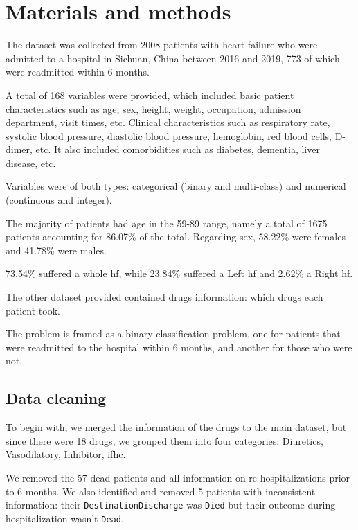 \section{Materials and methods}\label{sec:materials-methods}

The dataset was collected from 2008 patients with heart failure who were admitted to a hospital in Sichuan, China between 2016 and 2019, 773 of which were readmitted within 6 months.

A total of 168 variables were provided, which included basic patient characteristics such as age, sex, height, weight, occupation, admission department, visit times, etc. Clinical characteristics such as respiratory rate, systolic blood pressure, diastolic blood pressure, hemoglobin, red blood cells, D-dimer, etc. It also included comorbidities such as diabetes, dementia, liver disease, etc.

Variables were of both types: categorical (binary and multi-class) and numerical (continuous and integer).

The majority of patients had age in the 59-89 range, namely a total of 1675 patients accounting for 86.07\% of the total. Regarding sex, 58.22\% were females and 41.78\% were males.

73.54\% suffered a whole \gls{hf}, while 23.84\% suffered a Left \gls{hf} and 2.62\% a Right \gls{hf}.

The other dataset provided contained drugs information: which drugs each patient took.

The problem is framed as a binary classification problem, one for patients that were readmitted to the hospital within 6 months, and another for those who were not.

\subsection{Data cleaning}\label{sec:data-cleaning}

To begin with, we merged the information of the drugs to the main dataset, but since there were 18 drugs, we grouped them into four categories: Diuretics, Vasodilatory, Inhibitor, \gls{ifhc}.

We removed the 57 dead patients and all information on re-hospitalizations prior to 6 months. We also identified and removed 5 patients with inconsistent information: their \texttt{DestinationDischarge} was \texttt{Died} but their outcome during hospitalization wasn't \texttt{Dead}.


